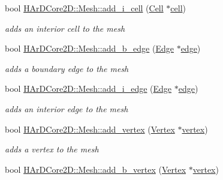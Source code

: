 \begin{DoxyCompactItemize}
bool \hyperlink{group__Mesh_ga3a47d6ebfdb4254c57b7b672b51a992b}{H\+Ar\+D\+Core2\+D\+::\+Mesh\+::add\+\_\+i\+\_\+cell} (\hyperlink{classHArDCore2D_1_1Cell}{Cell} $\ast$\hyperlink{classHArDCore2D_1_1Mesh_ae07b938c57cf57e3bb9c76d3df1eb549}{cell})
\begin{DoxyCompactList}\small\item\em adds an interior cell to the mesh \end{DoxyCompactList}\item 
\mbox{\label{group__Mesh_ga170b0f0bf5751a8e0cba0f5efccc66c4}} 
bool \hyperlink{group__Mesh_ga170b0f0bf5751a8e0cba0f5efccc66c4}{H\+Ar\+D\+Core2\+D\+::\+Mesh\+::add\+\_\+b\+\_\+edge} (\hyperlink{classHArDCore2D_1_1Edge}{Edge} $\ast$\hyperlink{classHArDCore2D_1_1Mesh_acad7cdf3d2c00fa6fc23ff77c63c7d1a}{edge})
\begin{DoxyCompactList}\small\item\em adds a boundary edge to the mesh \end{DoxyCompactList}\item 
\mbox{\label{group__Mesh_ga1e55100bee1027f4ab3980bf020c5df7}} 
bool \hyperlink{group__Mesh_ga1e55100bee1027f4ab3980bf020c5df7}{H\+Ar\+D\+Core2\+D\+::\+Mesh\+::add\+\_\+i\+\_\+edge} (\hyperlink{classHArDCore2D_1_1Edge}{Edge} $\ast$\hyperlink{classHArDCore2D_1_1Mesh_acad7cdf3d2c00fa6fc23ff77c63c7d1a}{edge})
\begin{DoxyCompactList}\small\item\em adds an interior edge to the mesh \end{DoxyCompactList}\item 
\mbox{\label{group__Mesh_ga9dc43dcebaa54356ddbaa45fbd94fa1a}} 
bool \hyperlink{group__Mesh_ga9dc43dcebaa54356ddbaa45fbd94fa1a}{H\+Ar\+D\+Core2\+D\+::\+Mesh\+::add\+\_\+vertex} (\hyperlink{classHArDCore2D_1_1Vertex}{Vertex} $\ast$\hyperlink{classHArDCore2D_1_1Mesh_ad099224c697c05a57fad6a47fdcd9e76}{vertex})
\begin{DoxyCompactList}\small\item\em adds a vertex to the mesh \end{DoxyCompactList}\item 
\mbox{\label{group__Mesh_ga75f0405bae618848b2349ebb26eec675}} 
bool \hyperlink{group__Mesh_ga75f0405bae618848b2349ebb26eec675}{H\+Ar\+D\+Core2\+D\+::\+Mesh\+::add\+\_\+b\+\_\+vertex} (\hyperlink{classHArDCore2D_1_1Vertex}{Vertex} $\ast$\hyperlink{classHArDCore2D_1_1Mesh_ad099224c697c05a57fad6a47fdcd9e76}{vertex})

\end{DoxyCompactItemize}
